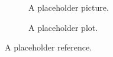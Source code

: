\Blindtext[3]
\begin{figure}[h]
	\centering
   \resizebox{0.55\textwidth}{!}{}
	\caption{A placeholder picture.}
	\label{fig:placeholder}
\end{figure}

\begin{figure}[h]
	\centering
   \resizebox{0.55\textwidth}{!}{}
	\caption{A placeholder plot.}
	\label{fig:placeholder}
\end{figure}

A placeholder reference\cite{goens_multiprog18}.
